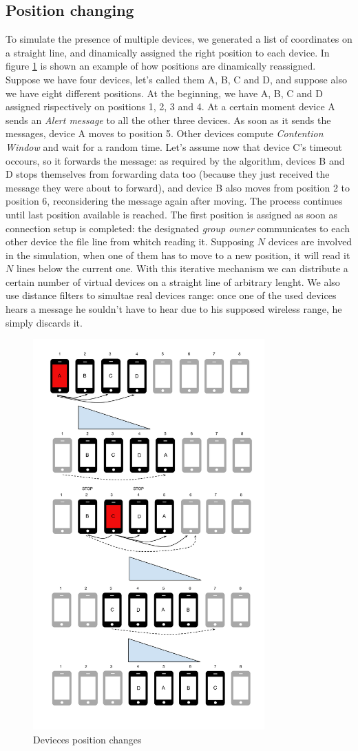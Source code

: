 \subsection{Position changing}
\label{sec:position_change}

To simulate the presence of multiple devices, we generated a list of coordinates on a straight line, and dinamically assigned the right position to each device. In figure \ref{fig:positions} is shown an example of how positions are dinamically reassigned. Suppose we have four devices, let's called them A, B, C and D, and suppose also we have eight different positions. At the beginning, we have A, B, C and D assigned rispectively on positions 1, 2, 3 and 4. At a certain moment device A sends an \emph{Alert message} to all the other three devices. As soon as it sends the messages, device A moves to position 5. Other devices compute \textit{Contention Window} and wait for a random time. Let's assume now that device C's timeout occours, so it forwards the message: as required by the algorithm, devices B and D stops themselves from forwarding data too (because they just received the message they were about to forward), and device B also moves from position 2 to position 6, reconsidering the message again after moving. The process continues until last position available is reached.
The first position is assigned as soon as connection setup is completed: the designated \textit{group owner} communicates to each other device the file line from whitch reading it. Supposing $N$ devices are involved in the simulation, when one of them has to move to a new position, it will read it $N$ lines below the current one.
With this iterative mechanism we can distribute a certain number of virtual devices on a straight line of arbitrary lenght. 
We also use distance filters to simultae real devices range: once one of the used devices hears a message he souldn't have to hear due to his supposed wireless range, he simply discards it.

\begin{figure}[htbp]
\centering
\includegraphics[width=3.5in]{imgs/Positions_1.pdf}
\caption{Devieces position changes}
\label{fig:positions}
\end{figure}
